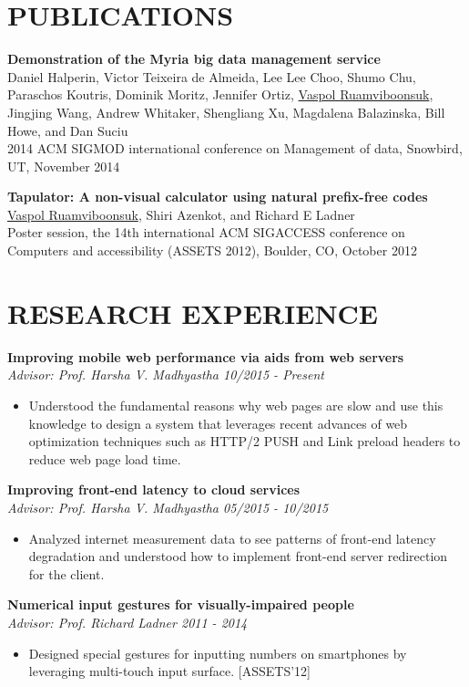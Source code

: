 \documentclass[zhemargin]{res}
\begin{document}
\begin{resume}
\section{\small PUBLICATIONS}
    \textbf{Demonstration of the Myria big data management service}\\
    Daniel Halperin, Victor Teixeira de Almeida, Lee Lee Choo, Shumo Chu, Paraschos Koutris, 
    Dominik Moritz, Jennifer Ortiz, \underline{Vaspol Ruamviboonsuk}, Jingjing Wang, 
    Andrew Whitaker, Shengliang Xu, Magdalena Balazinska, Bill Howe, and Dan Suciu\\
    2014 ACM SIGMOD international conference on Management of data, Snowbird, UT, November 2014

    \textbf{Tapulator: A non-visual calculator using natural prefix-free codes}\\
    \underline{Vaspol Ruamviboonsuk}, Shiri Azenkot, and Richard E Ladner\\
    Poster session, the 14th international ACM SIGACCESS conference on Computers and accessibility (ASSETS 2012), Boulder, CO, October 2012

\section{\small RESEARCH EXPERIENCE}
	\textbf{Improving mobile web performance via aids from web servers}\\
    \textit{Advisor: Prof. Harsha V. Madhyastha \hfill 10/2015 - Present}
	\begin{itemize}
    \item Understood the fundamental reasons why web pages are slow and use this 
      knowledge to design a system that leverages recent advances of web optimization 
      techniques such as HTTP/2 PUSH and Link preload headers to reduce 
      web page load time.
	\end{itemize}

	\textbf{Improving front-end latency to cloud services}\\
    \textit{Advisor: Prof. Harsha V. Madhyastha \hfill 05/2015 - 10/2015}
	\begin{itemize}
    \item Analyzed internet measurement data to see patterns of front-end latency 
      degradation and understood how to implement front-end server redirection for the client.
	\end{itemize}

	\textbf{Numerical input gestures for visually-impaired people}\\
    \textit{Advisor: Prof. Richard Ladner \hfill 2011 - 2014}
	\begin{itemize}
    \item Designed special gestures for inputting numbers on smartphones 
      by leveraging multi-touch input surface. [ASSETS'12]
	\end{itemize}


\end{resume}
\end{document}

